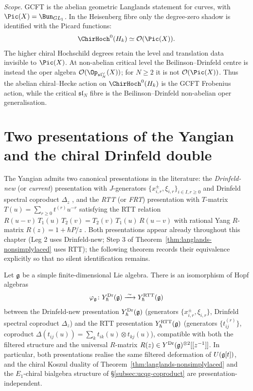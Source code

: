 \begin{remark}
\emph{Scope.} GCFT is the abelian geometric Langlands statement for
curves, with $\Pic(X)=\Bun_{GL_1}$. In the Heisenberg fibre only the
degree-zero shadow is identified with the Picard functions:
\[
 \ChirHoch^0(H_k)\simeq \mathcal O(\Pic(X)).
\]
The higher chiral Hochschild degrees retain the level and translation
data invisible to $\Pic(X)$. At non-abelian critical level the
Beilinson--Drinfeld centre is instead the oper algebra
\(\mathcal O(\Op_{\mathfrak{sl}_N^\vee}(X))\); for \(N\ge2\) it is
not \(\mathcal O(\Pic(X))\). Thus the abelian chiral--Hecke action on
\(\ChirHoch^0(H_k)\) is the GCFT Frobenius action, while the
critical \(\mathfrak{sl}_N\) fibre is the Beilinson--Drinfeld
non-abelian oper generalisation.
\end{remark}

\section{Two presentations of the Yangian and the chiral Drinfeld double}
\label{sec:yangian-two-presentations-drinfeld-double}

The Yangian admits two canonical presentations in the literature: the
\emph{Drinfeld-new} (or \emph{current}) presentation with $J$-generators
$\{x_{i,r}^{\pm}, \xi_{i,r}\}_{i\in I, r\ge 0}$ and Drinfeld spectral
coproduct $\Delta_z$ \cite{Drinfeld88}, and the \emph{RTT} (or
\emph{FRT}) presentation with $T$-matrix
$T(u) = \sum_{r\ge 0} t^{(r)} u^{-r}$ satisfying the RTT relation
$R(u-v)\, T_1(u)\, T_2(v) = T_2(v)\, T_1(u)\, R(u-v)$ with rational
Yang $R$-matrix $R(z) = 1 + \hbar P/z$ \cite{FaddeevReshetikhinTakhtajan89}.
Both presentations appear already throughout this chapter (Leg 2 uses
Drinfeld-new; Step 3 of Theorem~\ref{thm:langlands-nonsimplylaced} uses
RTT); the following theorem records their equivalence explicitly so
that no silent identification remains.

\begin{theorem}
\label{thm:yangian-two-presentations-equivalent}
\ClaimStatusProvedElsewhere
Let $\mathfrak{g}$ be a simple finite-dimensional Lie algebra. There is an
isomorphism of Hopf algebras
\[
 \varphi_{\mathfrak{g}}\colon Y_{\hbar}^{\mathrm{Dr}}(\mathfrak{g})
 \xrightarrow{\;\sim\;} Y_{\hbar}^{\mathrm{RTT}}(\mathfrak{g})
\]
between the Drinfeld-new presentation $Y_{\hbar}^{\mathrm{Dr}}(\mathfrak{g})$
(generators $\{x_{i,r}^{\pm}, \xi_{i,r}\}$, Drinfeld spectral coproduct
$\Delta_z$) and the RTT presentation $Y_{\hbar}^{\mathrm{RTT}}(\mathfrak{g})$
(generators $\{t_{ij}^{(r)}\}$, coproduct
$\Delta(t_{ij}(u)) = \sum_k t_{ik}(u)\otimes t_{kj}(u)$), compatible
with both the filtered structure and the universal $R$-matrix
$R(z)\in Y^{\mathrm{Dr}}(\mathfrak{g})^{\otimes 2}[[z^{-1}]]$. In particular,
both presentations realise the same filtered deformation of
$U(\mathfrak{g}[t])$, and the chiral Koszul duality of
Theorem~\ref{thm:langlands-nonsimplylaced} and the $E_1$-chiral
bialgebra structure of \S\ref{subsec:ucqg-coproduct} are
presentation-independent.
\end{theorem}

